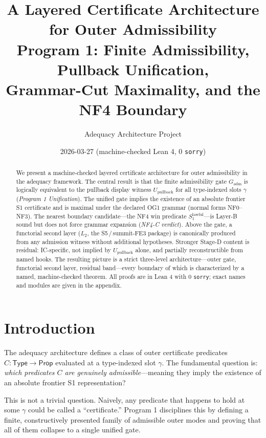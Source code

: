 \documentclass[11pt]{article}
\title{\textbf{A Layered Certificate Architecture\\for Outer Admissibility}\\[4pt]
  \large Program 1: Finite Admissibility, Pullback Unification,\\
  Grammar-Cut Maximality, and the NF4 Boundary}
\author{Adequacy Architecture Project}
\date{2026-03-27 \quad (machine-checked Lean 4, 0 \texttt{sorry})}
\theoremstyle{plain}
\theoremstyle{definition}
\newcommand{\Gadm}{G_{\mathrm{adm}}}
\newcommand{\Upb}{U_{\mathrm{pullback}}}
\newcommand{\Stwo}{L_2}
\newcommand{\SoneLawful}{S_1^{\mathrm{lawful}}}
\begin{document}
\maketitle

\begin{abstract}
We present a machine-checked layered certificate architecture for outer
admissibility in the adequacy framework.  The central result is that the
finite admissibility gate $\Gadm$ is logically equivalent to the pullback
display witness $\Upb$ for all type-indexed slots $\gamma$
(\emph{Program 1 Unification}).  The unified gate implies the existence of
an absolute frontier S1 certificate and is maximal under the declared OG1
grammar (normal forms NF0--NF3).  The nearest boundary candidate---the NF4
win predicate $\SoneLawful$---is Layer-B sound but does not force grammar
expansion (\emph{NF4-C verdict}).  Above the gate, a functorial second layer
($\Stwo$, the S5\,/\,summit-FE3 package) is canonically produced from any
admission witness without additional hypotheses.  Stronger Stage-D content is
residual: IC-specific, not implied by $\Upb$ alone, and partially
reconstructible from named hooks.  The resulting picture is a strict
three-level architecture---outer gate, functorial second layer, residual
band---every boundary of which is characterized by a named, machine-checked
theorem.  All proofs are in Lean 4 with 0 \texttt{sorry}; exact names and
modules are given in the appendix.
\end{abstract}

\tableofcontents
\bigskip

\section{Introduction}
\label{sec:intro}

The adequacy architecture defines a class of outer certificate predicates
$C : \mathsf{Type} \to \mathsf{Prop}$ evaluated at a type-indexed slot
$\gamma$.  The fundamental question is: \emph{which predicates $C$ are
genuinely admissible}---meaning they imply the existence of an absolute
frontier S1 representation?

This is not a trivial question.  Naively, any predicate that happens to hold
at some $\gamma$ could be called a ``certificate.''  Program 1 disciplines
this by defining a finite, constructively presented family of admissible outer
modes and proving that all of them collapse to a single unified gate.
\end{document}
